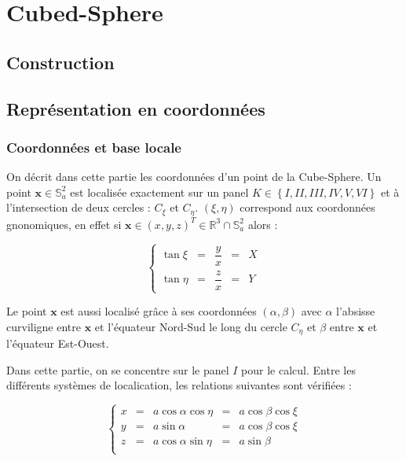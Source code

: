 \chapter{Cubed-Sphere}

\section{Construction}

\section{Représentation en coordonnées}

\subsection{Coordonnées et base locale}

On décrit dans cette partie les coordonnées d'un point de la Cube-Sphere. Un point $\mathbf{x} \in \mathbb{S}_a^2$ est localisée exactement sur un panel $K \in \left\lbrace I, II, III, IV, V, VI \right\rbrace$ et à l'intersection de deux cercles : $C_{\xi}$ et $C_{\eta}$. $(\xi,\eta)$ correspond aux coordonnées gnonomiques, en effet si $\mathbf{x} \in (x,y,z)^T \in \mathbb{R}^3 \cap \mathbb{S}_a^2$ alors :

\begin{equation}
\left\lbrace
\begin{array}{rcccl}
\tan \xi & = & \dfrac{y}{x} & = & X\\
\tan \eta & = & \dfrac{z}{x}& = & Y
\end{array}
\right.
\end{equation}

Le point $\mathbf{x}$ est aussi localisé grâce à ses coordonnées $(\alpha, \beta)$ avec $\alpha$ l'absisse curviligne entre $\mathbf{x}$ et l'équateur Nord-Sud le long du cercle $C_{\eta}$ et $\beta$ entre $\mathbf{x}$ et l'équateur Est-Ouest.

Dans cette partie, on se concentre sur le panel $I$ pour le calcul.
Entre les différents systèmes de localication, les relations suivantes sont vérifiées :

\begin{equation}
\left\lbrace
\begin{array}{rcccl}
x & = & a \cos \alpha \cos \eta & = & a \cos \beta \cos \xi \\
y & = & a \sin \alpha & = & a \cos \beta \cos \xi \\
z & = & a \cos \alpha \sin \eta & = & a \sin \beta \\
\end{array}
\right.
\end{equation}

